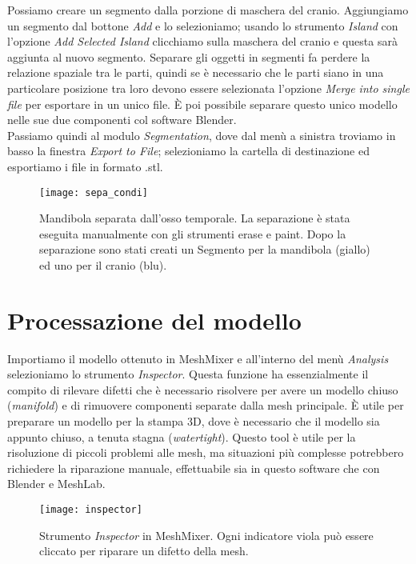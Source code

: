 Possiamo creare un segmento dalla porzione di maschera del cranio. Aggiungiamo un segmento dal bottone \emph{Add} e lo selezioniamo; usando lo strumento \emph{Island} con l'opzione \emph{Add Selected Island} clicchiamo sulla maschera del cranio e questa sarà aggiunta al nuovo segmento. Separare gli oggetti in segmenti fa perdere la relazione spaziale tra le parti, quindi se è necessario che le parti siano in una particolare posizione tra loro devono essere selezionata l'opzione \emph{Merge into single file} per esportare in un unico file. È poi possibile separare questo unico modello nelle sue due componenti col software Blender. \\
Passiamo quindi al modulo \emph{Segmentation}, dove dal menù a sinistra troviamo in basso la finestra \emph{Export to File}; selezioniamo la cartella di destinazione ed esportiamo i file in formato .stl.
\begin{figure}[h]
\centering
\texttt{[image: sepa\_condi]}
\caption{Mandibola separata dall'osso temporale. La separazione è stata eseguita manualmente con gli strumenti erase e paint. Dopo la separazione sono stati creati un Segmento per la mandibola (giallo) ed uno per il cranio (blu).}
\label{fig:sepa_condi}
\end{figure}

\section{Processazione del modello}
Importiamo il modello ottenuto in MeshMixer e all'interno del menù \emph{Analysis} selezioniamo lo strumento \emph{Inspector}. Questa funzione ha essenzialmente il compito di rilevare difetti che è necessario risolvere per avere un modello chiuso (\emph{manifold}) e di rimuovere componenti separate dalla mesh principale. È utile per preparare un modello per la stampa 3D, dove è necessario che il modello sia appunto chiuso, a tenuta stagna (\emph{watertight}). Questo tool è utile per la risoluzione di piccoli problemi alle mesh, ma situazioni più complesse potrebbero richiedere la riparazione manuale, effettuabile sia in questo software che con Blender e MeshLab.
\vspace{3cm}
\begin{figure}[h]
\centering
\texttt{[image: inspector]}
\caption{Strumento \emph{Inspector} in MeshMixer. Ogni indicatore viola può essere cliccato per riparare un difetto della mesh.}
\label{fig:inspector}
\end{figure}


